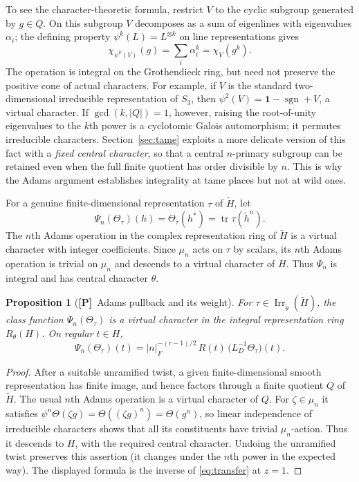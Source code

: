 \documentclass[11pt]{article}
\newcommand{\Irr}{\operatorname{Irr}}
\newcommand{\tH}{\widetilde H}
\newcommand{\Ptag}{\textnormal{\textbf{[P]}}}
\theoremstyle{plain}
\newtheorem{proposition}[theorem]{Proposition}
\theoremstyle{definition}
\begin{document}
To see the character-theoretic formula, restrict $V$ to the cyclic subgroup
generated by $g\in Q$. On this subgroup $V$ decomposes as a sum of eigenlines
with eigenvalues $\alpha_i$; the defining property $\psi^k(L)=L^{\otimes k}$
on line representations gives
\begin{equation}\label{eq:adams-def-background}
\boxed{\quad\chi_{\psi^k(V)}(g)=\sum_i\alpha_i^k
      =\chi_V(g^k).\quad}
\end{equation}
The operation is integral on the Grothendieck ring, but need not preserve the
positive cone of actual characters. For example, if $V$ is the standard
two-dimensional irreducible representation of $S_3$, then
$\psi^2(V)=\mathbf1-\operatorname{sgn}+V$, a virtual character.
If $\gcd(k,|Q|)=1$, however, raising the root-of-unity eigenvalues to the
$k$th power is a cyclotomic Galois automorphism; it permutes irreducible
characters. Section~\ref{sec:tame} exploits a more delicate version of this
fact with a \emph{fixed central character}, so that a central $n$-primary
subgroup can be retained even when the full finite quotient has order
divisible by $n$. This is why the Adams argument establishes integrality at
tame places but not at wild ones.

For a genuine finite-dimensional representation $\tau$ of $\tH$, let
\[
\Psi_n(\Theta_\tau)(h)=\Theta_\tau(h^*)=\operatorname{tr}\tau(\widetilde h^n).
\]
The $n$th Adams operation in the complex representation ring of $\tH$ is a virtual character with integer coefficients. Since $\mu_n$ acts on $\tau$ by scalars, its $n$th Adams operation is trivial on $\mu_n$ and descends to a virtual character of $H$. Thus $\Psi_n$ is integral and has central character $\theta$.

\begin{proposition}[\Ptag\ Adams pullback and its weight]\label{prop:adams}
For $\tau\in\Irr_{\widetilde\theta}(\tH)$, the class function $\Psi_n(\Theta_\tau)$ is a virtual character in the integral representation ring $R_\theta(H)$. On regular $t\in H$,
\begin{equation}\label{eq:adamsweight}
\Psi_n(\Theta_\tau)(t)=
|n|_F^{-(r-1)/2}\,R(t)\,\bigl(L_D^{-1}\Theta_\tau\bigr)(t).
\end{equation}
\end{proposition}
\begin{proof}
After a suitable unramified twist, a given finite-dimensional smooth representation has finite image, and hence factors through a finite quotient $Q$ of $\tH$. The usual $n$th Adams operation is a virtual character of $Q$. For $\zeta\in\mu_n$ it satisfies $\psi^n\Theta(\zeta g)=\Theta((\zeta g)^n)=\Theta(g^n)$, so linear independence of irreducible characters shows that all its constituents have trivial $\mu_n$-action. Thus it descends to $H$, with the required central character. Undoing the unramified twist preserves this assertion (it changes under the $n$th power in the expected way). The displayed formula is the inverse of \eqref{eq:transfer} at $z=1$.
\end{proof}
\end{document}
